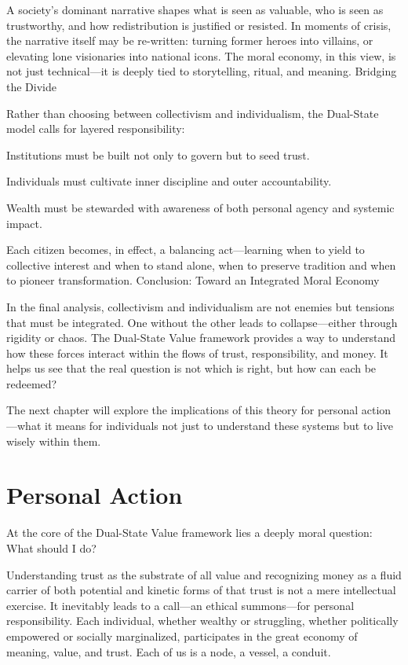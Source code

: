 \documentclass[11pt,oneside]{book}
\begin{document}
A society’s dominant narrative shapes what is seen as valuable, who is seen as trustworthy, and how redistribution is justified or resisted. In moments of crisis, the narrative itself may be re-written: turning former heroes into villains, or elevating lone visionaries into national icons. The moral economy, in this view, is not just technical—it is deeply tied to storytelling, ritual, and meaning.
Bridging the Divide

Rather than choosing between collectivism and individualism, the Dual-State model calls for layered responsibility:

    Institutions must be built not only to govern but to seed trust.

    Individuals must cultivate inner discipline and outer accountability.

    Wealth must be stewarded with awareness of both personal agency and systemic impact.

Each citizen becomes, in effect, a balancing act—learning when to yield to collective interest and when to stand alone, when to preserve tradition and when to pioneer transformation.
Conclusion: Toward an Integrated Moral Economy

In the final analysis, collectivism and individualism are not enemies but tensions that must be integrated. One without the other leads to collapse—either through rigidity or chaos. The Dual-State Value framework provides a way to understand how these forces interact within the flows of trust, responsibility, and money. It helps us see that the real question is not which is right, but how can each be redeemed?

The next chapter will explore the implications of this theory for personal action—what it means for individuals not just to understand these systems but to live wisely within them.




\chapter{Personal Action}

At the core of the Dual-State Value framework lies a deeply moral question: What should I do?

Understanding trust as the substrate of all value and recognizing money as a fluid carrier of both potential and kinetic forms of that trust is not a mere intellectual exercise. It inevitably leads to a call—an ethical summons—for personal responsibility. Each individual, whether wealthy or struggling, whether politically empowered or socially marginalized, participates in the great economy of meaning, value, and trust. Each of us is a node, a vessel, a conduit.
\end{document}
